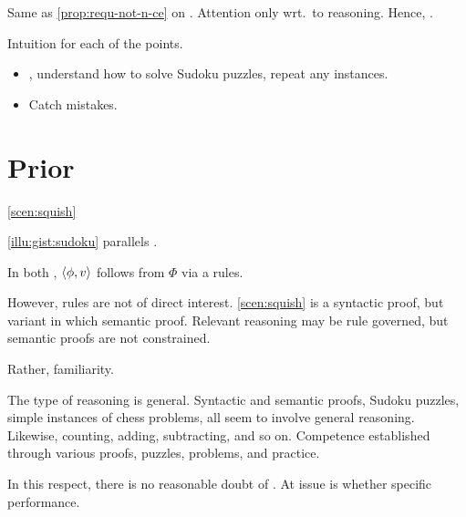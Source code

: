 \begin{note}
  Same as \autoref{prop:requ-not-n-ce} on .
  Attention only wrt.\ to reasoning.
  Hence, \wit{}.
\end{note}

\begin{note}
  Intuition for each of the points.

  \begin{itemize}
  \item
    , understand how to solve Sudoku puzzles, repeat any instances.
  \item
    Catch mistakes.
  \end{itemize}
\end{note}

\section{Prior }
\label{sec:cscen1}


\begin{note}
  \autoref{scen:squish}
\end{note}

\begin{note}
  \autoref{illu:gist:sudoku} parallels .

  In both , \(\langle \phi, v \rangle\) follows from \(\Phi\) via a rules.

  However, rules are not of direct interest.
  \autoref{scen:squish} is a syntactic proof, but variant  in which semantic proof.
  Relevant reasoning may be rule governed, but semantic proofs are not constrained.

  Rather, familiarity.

  The type of reasoning is general.
  Syntactic and semantic proofs, Sudoku puzzles, simple instances of chess problems, all seem to involve general reasoning.
  Likewise, counting, adding, subtracting, and so on.
  Competence established through various proofs, puzzles, problems, and practice.

  In this respect, there is no reasonable doubt of \tC{}.
  At issue is whether specific performance.
\end{note}



